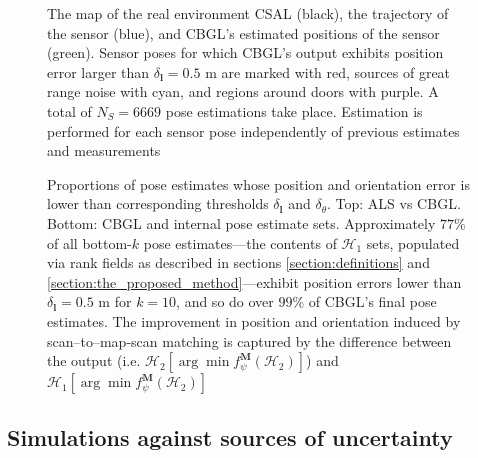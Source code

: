 \begin{figure}
  
  \vspace{-0.7cm}
  \caption{\small The map of the real environment CSAL (black), the trajectory
           of the sensor (blue), and CBGL's estimated positions of the sensor
           (green). Sensor poses for which CBGL's output exhibits position
           error larger than $\delta_{\bm{l}} = 0.5$ m are marked with red,
           sources of great range noise with cyan, and regions around doors
           with purple. A total of $N_S = 6669$ pose estimations take place.
           Estimation is performed for each sensor pose independently of
           previous estimates and measurements}
  \vspace{-0.5cm}
  \label{fig:a:map_and_trajectory}
\end{figure}

\begin{figure}
  \vspace{-0.4cm}
  
  \vspace{0.01cm}
  \caption{\small Proportions of pose estimates whose position and orientation
           error is lower than corresponding thresholds $\delta_{\bm{l}}$ and
           $\delta_{\theta}$. Top: ALS vs CBGL. Bottom: CBGL and internal pose
           estimate sets.  Approximately $77\%$ of all bottom-$k$ pose
           estimates---the contents of $\mathcal{H}_1$ sets, populated via rank
           fields as described in sections \ref{section:definitions} and
           \ref{section:the_proposed_method}---exhibit position errors lower
           than $\delta_{\bm{l}} = 0.5$ m for $k=10$, and so do over $99\%$ of
           CBGL's final pose estimates. The improvement in position and
           orientation induced by scan--to--map-scan matching is captured by
           the difference between the output (i.e.  $\mathcal{H}_2[\arg \min
           f_{\psi}^{\bm{M}}(\mathcal{H}_2)]$) and $\mathcal{H}_1[\arg \min
           f_{\psi}^{\bm{M}}(\mathcal{H}_2)]$}
  \vspace{-0.5cm}
  \label{fig:a:awesomeness}
\end{figure}


\subsection{Simulations against sources of uncertainty}
\label{subsec:exp_b}

